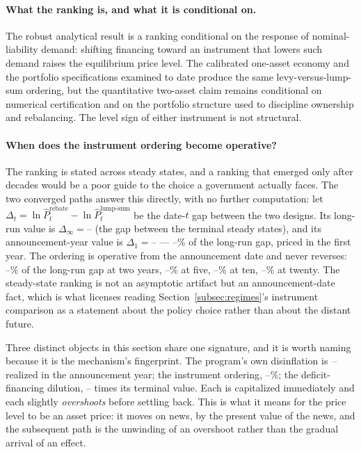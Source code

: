 \documentclass[12pt]{article}
\providecommand{\pendingnum}{\textit{--}}
\providecommand{\OrdImp}{\pendingnum}\providecommand{\OrdInf}{\pendingnum}
\providecommand{\OrdOne}{\pendingnum}\providecommand{\OrdTwo}{\pendingnum}
\providecommand{\OrdFive}{\pendingnum}\providecommand{\OrdTen}{\pendingnum}
\providecommand{\OrdTwenty}{\pendingnum}\providecommand{\OrdFlowImp}{\pendingnum}
\providecommand{\DefCD}{\pendingnum}
\begin{document}
\paragraph{What the ranking is, and what it is conditional on.} The robust
analytical result is a ranking conditional on the response of
nominal-liability demand: shifting financing toward an instrument that lowers
such demand raises the equilibrium price level. The calibrated one-asset
economy and the portfolio specifications examined to date produce the same
levy-versus-lump-sum ordering, but the quantitative two-asset claim remains
conditional on numerical certification and on the portfolio structure used to
discipline ownership and rebalancing. The level sign of either instrument is
not structural.

\paragraph{When does the instrument ordering become operative?} The ranking
is stated across steady states, and a ranking that emerged
only after decades would be a poor guide to the choice a government
actually faces. The two converged paths answer this directly, with no
further computation: let
$\Delta_t=\ln\hat P_t^{\text{rebate}}-\ln\hat P_t^{\text{lump-sum}}$ be the
date-$t$ gap between the two designs. Its long-run value is
$\Delta_\infty=\OrdInf$ (the gap between the terminal steady states), and
its announcement-year value is $\Delta_1=\OrdImp$ --- $\OrdOne\%$ of the
long-run gap, priced in the first year. The ordering is operative from the
announcement date and never reverses: $\OrdTwo\%$ of the long-run gap at
two years, $\OrdFive\%$ at five, $\OrdTen\%$ at ten, $\OrdTwenty\%$ at
twenty. The steady-state ranking is not an asymptotic artifact but an
announcement-date fact, which is what licenses reading
Section~\ref{subsec:regimes}'s instrument comparison as a statement about
the policy choice rather than about the distant future.

Three distinct objects in this section share one signature, and it is
worth naming because it is the mechanism's fingerprint. The program's own
disinflation is $\OneTrShare$ realized in the announcement year; the
instrument ordering, $\OrdOne\%$; the deficit-financing dilution,
$\DefCD$ times its terminal value. Each is capitalized immediately and
each slightly \emph{overshoots} before settling back. This is what it
means for the price level to be an asset price: it moves on news, by the
present value of the news, and the subsequent path is the unwinding of an
overshoot rather than the gradual arrival of an effect.
\end{document}
